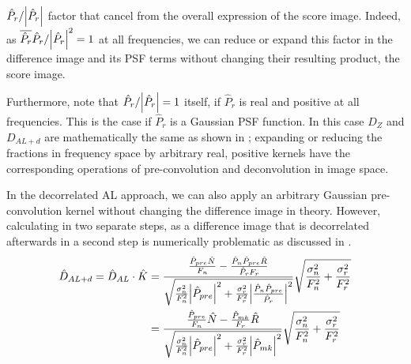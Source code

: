 \(\hat{P}_{r}/\abs{\hat{P}_{r}}\) factor that cancel from the overall
expression of the score image. Indeed, as
\(\overline{\hat{P}_r}\hat{P}_r/\abs{\hat{P}_r}^2 = 1\) at all
frequencies, we can reduce or expand this factor in the difference
image and its PSF terms without changing their resulting product, the
score image.
%
\par Furthermore, note that \(\hat{P}_r/\abs{\hat{P}_r}=1\) itself, if
\(\hat{P}_r\) is real and positive at all frequencies. This is the
case if \(\hat{P}_r\) is a Gaussian PSF function. In this case \(D_Z\)
and \(D_{AL+d}\) are mathematically the same as shown in
; expanding or reducing the fractions in frequency space
by arbitrary real, positive kernels have the corresponding operations
of pre-convolution and deconvolution in image space.
%
\par In the decorrelated AL approach, we can also apply an arbitrary
Gaussian pre-convolution kernel without changing the difference image
in theory. However, calculating  in two separate
steps, as a difference image that is decorrelated afterwards in a
second step is numerically problematic as discussed in
.
%
\begin{align}
  \hat{D}_{AL+d} =  \hat{D}_{AL} \cdot \hat{K}  &= \frac
  {\frac{\hat{P}_{pre}\hat{N}}{F_n} -
    \frac{\hat{P}_n\hat{P}_{pre}\hat{R}}{\hat{P}_r F_r} }
  {\sqrt{\frac{\sigma_n^2}{F_n^2}\abs{\hat{P}_{pre}}^2 +
      \frac{\sigma_r^2}{F_r^2}\abs{\frac{\hat{P}_n\hat{P}_{pre}}{\hat{P}_r}}^2}}
  \sqrt{\frac{\sigma_n^2}{F_n^2} + \frac{\sigma_r^2}{F_r^2}}
  \label{eq:DalPre}\\
%
  &= \frac
  {\frac{\hat{P}_{pre}}{F_n}\hat{N} -
    \frac{\hat{P}_{mk}}{F_r}\hat{R} }
  {\sqrt{\frac{\sigma_n^2}{F_n^2}\abs{\hat{P}_{pre}}^2 +
      \frac{\sigma_r^2}{F_r^2}\abs{\hat{P}_{mk}}^2}}
  \sqrt{\frac{\sigma_n^2}{F_n^2} + \frac{\sigma_r^2}{F_r^2}}\label{eq:DaldPreMk}
\end{align}
%
